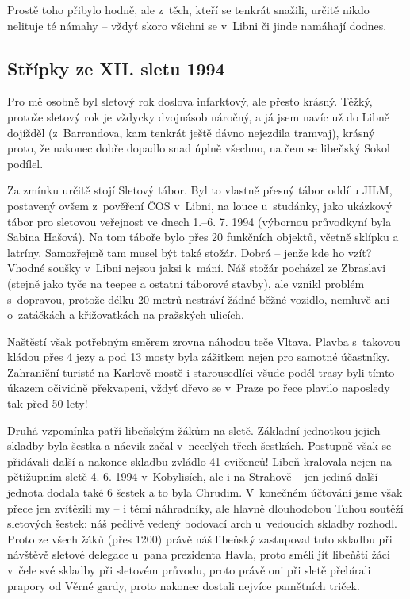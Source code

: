 \documentclass[a5paper, 12pt, twoside]{article}
\begin{document}
Prostě toho přibylo hodně, ale z~těch, kteří se tenkrát snažili, určitě
nikdo nelituje té námahy -- vždyť skoro všichni se v~Libni či jinde
namáhají dodnes.

\subsection{Střípky ze XII. sletu
1994}

Pro mě osobně byl sletový rok doslova infarktový, ale přesto krásný.
Těžký, protože sletový rok je vždycky dvojnásob náročný, a já jsem navíc
už do Libně dojížděl (z~Barrandova, kam tenkrát ještě dávno nejezdila
tramvaj), krásný proto, že nakonec dobře dopadlo snad úplně všechno, na
čem se libeňský Sokol podílel.

Za zmínku určitě stojí Sletový tábor. Byl to vlastně přesný tábor oddílu
JILM, postavený ovšem z~pověření ČOS v~Libni, na louce u~studánky, jako
ukázkový tábor pro sletovou veřejnost ve dnech 1.--6. 7. 1994 (výbornou
průvodkyní byla Sabina Hašová). Na tom táboře bylo přes 20 funkčních
objektů, včetně sklípku a latríny. Samozřejmě tam musel být také stožár.
Dobrá -- jenže kde ho vzít? Vhodné soušky v~Libni nejsou jaksi k~mání.
Náš stožár pocházel ze Zbraslavi (stejně jako tyče na teepee a ostatní
táborové stavby), ale vznikl problém s~dopravou, protože délku 20 metrů
nestráví žádné běžné vozidlo, nemluvě ani o~zatáčkách a křižovatkách na
pražských ulicích.

Naštěstí však potřebným směrem zrovna náhodou teče Vltava. Plavba
s~takovou kládou přes 4 jezy a pod 13 mosty byla zážitkem nejen pro
samotné účastníky. Zahraniční turisté na Karlově mostě i starousedlíci
všude podél trasy byli tímto úkazem očividně překvapeni, vždyť dřevo se
v~Praze po řece plavilo naposledy tak před 50 lety!

Druhá vzpomínka patří libeňským žákům na sletě. Základní jednotkou
jejich skladby byla šestka a nácvik začal v~necelých třech šestkách.
Postupně však se přidávali další a nakonec skladbu zvládlo 41 cvičenců!
Libeň kralovala nejen na pětižupním sletě 4. 6. 1994 v~Kobylisích, ale i
na Strahově -- jen jediná další jednota dodala také 6 šestek a to byla
Chrudim. V~konečném účtování jsme však přece jen zvítězili my -- i těmi
náhradníky, ale hlavně dlouhodobou Tuhou soutěží sletových šestek: náš
pečlivě vedený bodovací arch u~vedoucích skladby rozhodl. Proto ze všech
žáků (přes 1200) právě náš libeňský zastupoval tuto skladbu při návštěvě
sletové delegace u~pana prezidenta Havla, proto směli jít libeňští žáci
v~čele své skladby při sletovém průvodu, proto právě oni při sletě
přebírali prapory od Věrné gardy, proto nakonec dostali nejvíce
pamětních triček.
\end{document}
